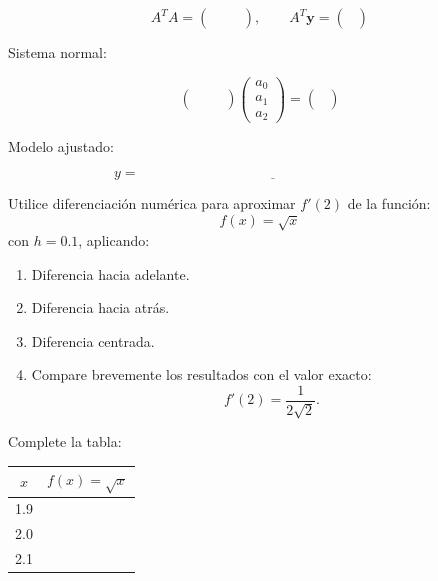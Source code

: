 \documentclass[10pt,respuestas,a4]{aleph-examen}
\begin{document}
\begin{preguntas}
\[
A^TA=
\begin{pmatrix}
 &  &  \\
 &  &  \\
 &  & 
\end{pmatrix},
\qquad
A^T\mathbf{y}=
\begin{pmatrix}
\\
\\
\end{pmatrix}
\]

Sistema normal:

\[
\begin{pmatrix}
 &  &  \\
 &  &  \\
 &  & 
\end{pmatrix}
\begin{pmatrix}
a_0\\
a_1\\
a_2
\end{pmatrix}
=
\begin{pmatrix}
\\
\\
\end{pmatrix}
\]

Modelo ajustado:

\[
y=\underline{\hspace{8cm}}
\]


\item
Utilice diferenciación numérica para aproximar $f'(2)$ de la función: 
\[
f(x)=\sqrt{x}
\]
con $h=0.1$, aplicando:

\begin{enumerate}[label=\alph*)]
    \item Diferencia hacia adelante.
    \item Diferencia hacia atrás.
    \item Diferencia centrada.
    \item Compare brevemente los resultados con el valor exacto:
    \[
    f'(2)=\frac{1}{2\sqrt{2}}.
    \]
\end{enumerate}

Complete la tabla:

\begin{center}
\renewcommand{\arraystretch}{1.4}
\begin{tabular}{c|c}
\toprule
$x$ & $f(x)=\sqrt{x}$ \\
\midrule
1.9 &  \\
2.0 &  \\
2.1 &  \\
\bottomrule
\end{tabular}
\end{center}


\end{preguntas}
\end{document}
